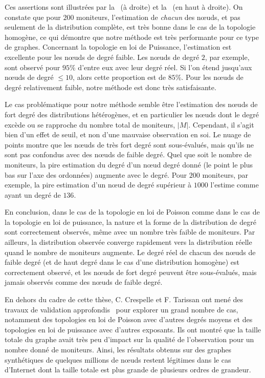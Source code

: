 Ces assertions sont illustrées par la~ (à
droite) et la~ (en haut à droite). On
constate que pour $200$ moniteurs, l'estimation de {\em chacun} des n\oe{}uds,
et pas seulement de la distribution complète, est très bonne dans le cas de la
topologie homogène, ce qui démontre que notre méthode est très performante pour
ce type de graphes. Concernant la topologie en loi de Puissance, l'estimation
est excellente pour les n\oe{}uds de degré faible. Les n\oe{}uds de degré $2$,
par exemple, sont observé pour $95\%$ d'entre eux avec leur degré réel. Si l'on
étend jusqu'aux n\oe{}uds de degré $\leq 10$, alors cette proportion est de
$85\%$. Pour les n\oe{}uds de degré relativement faible, notre méthode est donc
très satisfaisante.

Le cas problématique pour notre méthode semble être l'estimation des n\oe{}uds de
fort degré des distributions hétérogènes, et en particulier les n\oe{}uds dont le
degré excède ou se rapproche du nombre total de moniteurs, $|M|$. Cependant, il
s'agit bien d'un effet de seuil, et non d'une mauvaise observation en soi. Le
nuage de points montre que les n\oe{}uds de très fort degré sont sous-évalués, mais
qu'ils ne sont pas confondus avec des n\oe{}uds de faible degré. Quel que soit le
nombre de moniteurs, la pire estimation du degré d'un n\oe{}ud degré donné (le
point le plus bas sur l'axe des ordonnées) augmente avec le degré. Pour $200$
moniteurs, par exemple, la pire estimation d'un n\oe{}ud de degré supérieur à
$1000$ l'estime comme ayant un degré de $136$.

En conclusion, dans le cas de la topologie en loi de Poisson comme dans le cas
de la topologie en loi de puissance, la nature et la forme de la distribution de
degré sont correctement observés, même avec un nombre très faible de moniteurs.
Par ailleurs, la distribution observée converge rapidement vers la distribution
réelle quand le nombre de moniteurs augmente. Le degré réel de chacun des n\oe{}uds
de faible degré (et de haut degré dans le cas d'une distribution homogène) est
correctement observé, et les n\oe{}uds de fort degré peuvent être sous-évalués,
mais jamais observés comme des n\oe{}uds de faible degré.

En dehors du cadre de cette thèse, C. Crespelle et F. Tarissan ont mené des
travaux de validation approfondis~\cite{CT01} pour explorer un grand nombre de
cas, notamment des topologies en loi de Poisson avec d'autres degrés moyens et
des topologies en loi de puissance avec d'autres exposants.
Ils ont montré que la taille totale du graphe avait très peu d'impact sur la
qualité de l'observation pour un nombre donné de moniteurs.
Ainsi, les résultats obtenus sur des graphes synthétiques de quelques millions
de n\oe{}uds restent légitimes dans le cas d'Internet dont la taille totale est
plus grande de plusieurs ordres de grandeur.

